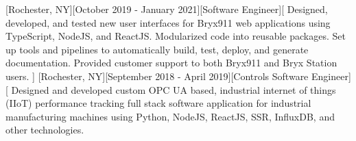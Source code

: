 \documentclass[showluaboxes=false]{resume}
\begin{document}
		[Rochester, NY][October 2019 - January 2021][Software Engineer][%
		Designed, developed, and tested new user interfaces for Bryx911 web applications using TypeScript, NodeJS, and ReactJS. %
		Modularized code into reusable packages. %
		Set up tools and pipelines to automatically build, test, deploy, and generate documentation. %
		Provided customer support to both Bryx911 and Bryx Station users.%
%
		]%
		[Rochester, NY][September 2018 - April 2019][Controls Software Engineer][%
		Designed and developed custom OPC UA based, industrial internet of things (IIoT) performance tracking full stack software application for industrial manufacturing machines using Python, NodeJS, ReactJS, SSR, InfluxDB, and other technologies.%
\end{document}
